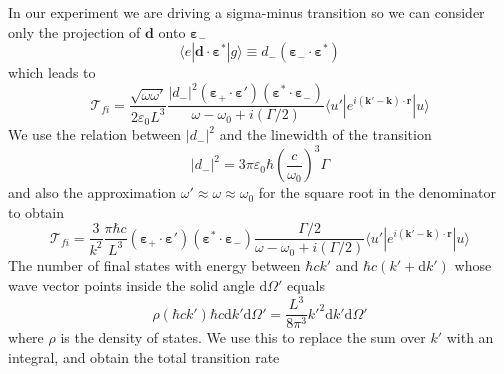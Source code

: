 \documentclass[11pt,letter]{article}
\newcommand{\bv}[1]{\ensuremath{\bm{#1}}}
\begin{document}
In our experiment we are driving a sigma-minus transition so we can consider
only the projection of $\bv{d}$ onto $\bv{\varepsilon}_{-}$ 
\begin{equation}
     \langle e | \bv{d} \cdot \bv{\varepsilon}^{*} | g \rangle  \equiv
     d_{-} (\bv{\varepsilon}_{-}  \cdot \bv{\varepsilon}^{*} )
\end{equation} 
which leads to 
\begin{equation}
    \mathcal{T}_{fi}  = 
    \frac{\sqrt{\omega \omega'}}{2\varepsilon_{0} L^{3}}
    \frac{ |d_{-}|^{2}  (\bv{\varepsilon}_{+}\cdot \bv{\varepsilon}' )
                       (\bv{\varepsilon}^{*}\cdot \bv{\varepsilon}_{-} )}
        { \omega - \omega_{0} + i (\Gamma/2 ) }
      \langle u' | e^{i(\bv{k}'-\bv{k}) \cdot\bv{r}} | u  \rangle
\end{equation}
We use the relation between $|d_{-}|^{2}$ and the linewidth of the transition
\begin{equation} 
    |d_{-}|^{2} =  3\pi \varepsilon_{0} \hbar
  \left( \frac{c}{\omega_{0}} \right)^{3}  \Gamma
\end{equation}
and also the approximation $\omega' \approx \omega \approx \omega_{0}$ for the
square root in the denominator to obtain
\begin{equation}
    \mathcal{T}_{fi} =
    \frac{ 3 } {k^{2}} 
    \frac{ \pi \hbar c } {  L^{3} } 
        (\bv{\varepsilon}_{+}\cdot \bv{\varepsilon}' )
                       (\bv{\varepsilon}^{*}\cdot \bv{\varepsilon}_{-} )
    \frac{ \Gamma/2  }
        { \omega - \omega_{0} + i (\Gamma/2 ) }
      \langle u' | e^{i(\bv{k}'-\bv{k}) \cdot\bv{r}} | u  \rangle
\end{equation}
The number of final states with energy between $\hbar c k'$ and $\hbar c ( k' +
\mathrm{d}k')$  whose wave vector points inside the solid angle $\mathrm{d}
\Omega'$ equals 
\begin{equation}
    \rho( \hbar c k') \hbar c \mathrm{d} k' \mathrm{d} \Omega ' = \frac{L^{3}}{8 \pi^{3} }  k'^{2} \mathrm{d} k' \mathrm{d} \Omega' 
\end{equation}
where $\rho$ is the density of states.  We use this to replace the sum over
$k'$ with an integral,  and obtain the total transition rate 
\end{document}
